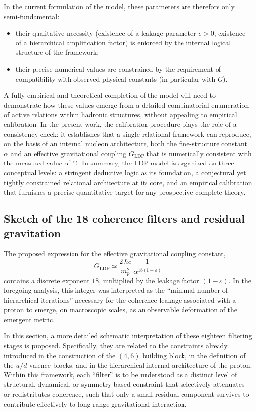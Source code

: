 \documentclass[11pt,a4paper]{article}
\begin{document}
In the current formulation of the model, these parameters are therefore only semi‑fundamental:
\begin{itemize}[label=-]
  \item their qualitative necessity (existence of a leakage parameter \(\epsilon > 0\), existence of a hierarchical amplification factor) is enforced by the internal logical structure of the framework;
  \item their precise numerical values are constrained by the requirement of compatibility with observed physical constants (in particular with \(G\)).
\end{itemize}

A fully empirical and theoretical completion of the model will need to demonstrate how these values emerge from a detailed combinatorial enumeration of active relations within hadronic structures, without appealing to empirical calibration. In the present work, the calibration procedure plays the role of a consistency check: it establishes that a single relational framework can reproduce, on the basis of an internal nucleon architecture, both the fine-structure constant \(\alpha\) and an effective gravitational coupling \(G_{\mathrm{LDP}}\) that is numerically consistent with the measured value of \(G\). In summary, the LDP model is organized on three conceptual levels: a stringent deductive logic as its foundation, a conjectural yet tightly constrained relational architecture at its core, and an empirical calibration that furnishes a precise quantitative target for any prospective complete theory.

\subsection{Sketch of the 18 coherence filters and residual gravitation}

The proposed expression for the effective gravitational coupling constant,
\[
G_{\mathrm{LDP}} \simeq \frac{2 \,\hbar c}{m_{p}^{2}} \,\frac{1}{\alpha^{18(1-\varepsilon)}}
\]
contains a discrete exponent \(18\), multiplied by the leakage factor \((1-\varepsilon)\). In the foregoing analysis, this integer was interpreted as the “minimal number of hierarchical iterations” necessary for the coherence leakage associated with a proton to emerge, on macroscopic scales, as an observable deformation of the emergent metric. 

In this section, a more detailed schematic interpretation of these eighteen filtering stages is proposed. Specifically, they are related to the constraints already introduced in the construction of the \((4,6)\) building block, in the definition of the \(u/d\) valence blocks, and in the hierarchical internal architecture of the proton. Within this framework, each “filter” is to be understood as a distinct level of structural, dynamical, or symmetry-based constraint that selectively attenuates or redistributes coherence, such that only a small residual component survives to contribute effectively to long-range gravitational interaction.
\end{document}
